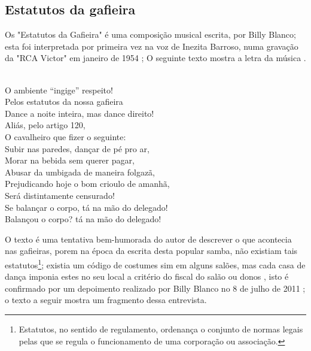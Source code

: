 \subsection{Estatutos da gafieira}
Os "Estatutos da Gafieira" é uma composição musical escrita, por Billy Blanco;
esta foi interpretada por primeira vez na voz de Inezita Barroso, 
numa gravação da "RCA Victor" em janeiro de 1954 \cite{musicaestatuto};
O seguinte texto mostra a letra da música \cite[pp. 95]{musicaestatutojournal1955}.
\begin{tcolorbox}[breakable,colback=lowgray,colframe=lowgray]%
\\
O ambiente ``ingige'' respeito!\\
Pelos estatutos da nossa gafieira\\
Dance a noite inteira, mas dance direito!\\
Aliás, pelo artigo 120,\\
O cavalheiro que fizer o seguinte:\\
Subir nas paredes, dançar de pé pro ar,\\
Morar na bebida sem querer pagar,\\
Abusar da umbigada de maneira folgazã,\\
Prejudicando hoje o bom crioulo de amanhã,\\
Será distintamente censurado!\\
Se balançar o corpo, tá na mão do delegado!\\
Balançou o corpo? tá na mão do delegado!\\
\end{tcolorbox}
O texto é uma tentativa bem-humorada do autor de descrever o que acontecia 
nas gafieiras, porem na época da escrita desta popular samba, não
existiam tais estatutos\footnote{Estatutos, no sentido de regulamento, 
ordenança o conjunto de normas legais pelas que se regula o funcionamento de uma corporação ou associação.};
existia um código de costumes sim \cite[pp. 13]{respeitojournalbrasil1} em alguns salões, 
mas cada casa de dança imponia estes no seu local a critério do fiscal do salão ou donos \cite[pp. 10]{simoesjournalbrasil1} \cite{entrevistajuliojournalbrasil1} \cite[pp. 37]{gafieirajournalmanchete},
isto é confirmado por um depoimento realizado por 
Billy Blanco no 8 de julho de 2011 \cite{depoimentobilly}; o texto a seguir
mostra um fragmento dessa entrevista.

